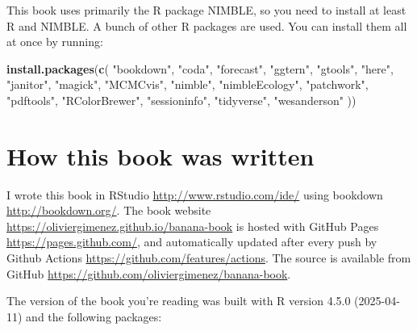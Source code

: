 \documentclass[
  12pt,
]{krantz}
\newenvironment{Shaded}{\begin{snugshade}}{\end{snugshade}}
\newcommand{\FunctionTok}[1]{\textcolor[rgb]{0.13,0.29,0.53}{\textbf{#1}}}
\newcommand{\NormalTok}[1]{#1}
\newcommand{\StringTok}[1]{\textcolor[rgb]{0.31,0.60,0.02}{#1}}
\begin{document}
This book uses primarily the R package NIMBLE, so you need to install at least R and NIMBLE. A bunch of other R packages are used. You can install them all at once by running:

\begin{Shaded}
\begin{Highlighting}[]
\FunctionTok{install.packages}\NormalTok{(}\FunctionTok{c}\NormalTok{(}
  \StringTok{"bookdown"}\NormalTok{, }\StringTok{"coda"}\NormalTok{, }\StringTok{"forecast"}\NormalTok{, }\StringTok{"ggtern"}\NormalTok{, }\StringTok{"gtools"}\NormalTok{, }
  \StringTok{"here"}\NormalTok{, }\StringTok{"janitor"}\NormalTok{, }\StringTok{"magick"}\NormalTok{, }\StringTok{"MCMCvis"}\NormalTok{, }\StringTok{"nimble"}\NormalTok{, }
  \StringTok{"nimbleEcology"}\NormalTok{, }\StringTok{"patchwork"}\NormalTok{, }\StringTok{"pdftools"}\NormalTok{, }
  \StringTok{"RColorBrewer"}\NormalTok{, }\StringTok{"sessioninfo"}\NormalTok{, }\StringTok{"tidyverse"}\NormalTok{, }
  \StringTok{"wesanderson"} 
\NormalTok{))}
\end{Highlighting}
\end{Shaded}

\section*{How this book was written}\label{how-this-book-was-written}


I wrote this book in RStudio \url{http://www.rstudio.com/ide/} using bookdown \url{http://bookdown.org/}. The book website \url{https://oliviergimenez.github.io/banana-book} is hosted with GitHub Pages \url{https://pages.github.com/}, and automatically updated after every push by Github Actions \url{https://github.com/features/actions}. The source is available from GitHub \url{https://github.com/oliviergimenez/banana-book}.

The version of the book you're reading was built with R version 4.5.0 (2025-04-11) and the following packages:
\end{document}
